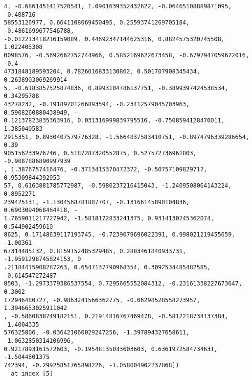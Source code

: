 \documentclass[12pt,a4paper]{article}
\begin{document}
\begin{lstlisting}
4, -0.6861451417520541, 1.0901639352432622, -0.06465108889871095, -0.408716
58553126977, 0.6641108069450495, 0.25593741269705184, -0.4861699677546788, 
-0.012213418216159089, 0.44692347144625316, 0.8824575320745508, 1.022405308
0098576, -0.5692662752744966, 0.5852169622673458, -0.6797947059672016, -0.4
4731848189593204, 0.7826016833130862, 0.501707908345434, 0.2638903069269914
5, -0.6183857525874836, 0.8993104786137751, -0.3899397424538534, 0.34295788
43278232, -0.19189701266893594, -0.23412579045703963, 0.5908260880438949, -
0.12137823835363916, 0.031316999839795516, -0.7508594128470011, 1.385040583
2915351, 0.8930407579776328, -1.5664837583410751, -0.8974796339286654, 0.39
905156233976746, 0.5187287320552875, 0.527572736961803, -0.9087886890997939
, 1.3876757416476, -0.3713415370472372, -0.50757109829717, 0.95309844392953
57, 0.6163881785772987, -0.5980237216415043, -1.2409508064143224, 0.8952271
239425131, -1.1304568781807707, -0.13166145890104836, 0.6903094068464418, -
1.7659011217727942, -1.5818172833241375, 0.9314130245362074, 0.544902459610
8625, 0.17148639117193745, -0.7239079696022391, 0.998021219455659, -1.00361
67314485132, 0.8159152485329485, 0.2883461840933731, -1.9591298745824153, 0
.21184415908287263, 0.6547137790968354, 0.3092534485482585, -0.614547272487
8503, -1.2973379386537554, 0.7295665552084312, -0.23161338227673647, 0.3002
172946480727, -0.9863241566362775, -0.06298528558273957, 1.3946653025911042
, -0.5860838749182151, 0.21914816767469478, -0.5812218734137384, -1.4004335
576325806, -0.036421060029247256, -1.397894327658611, -1.0632850314106996, 
0.9217893161572603, -0.19548135033603603, 0.6361972584734631, -1.5044801375
742394, -0.29925851765898226, -1.058004902237868])
  at index [5]
\end{lstlisting}
\end{document}
